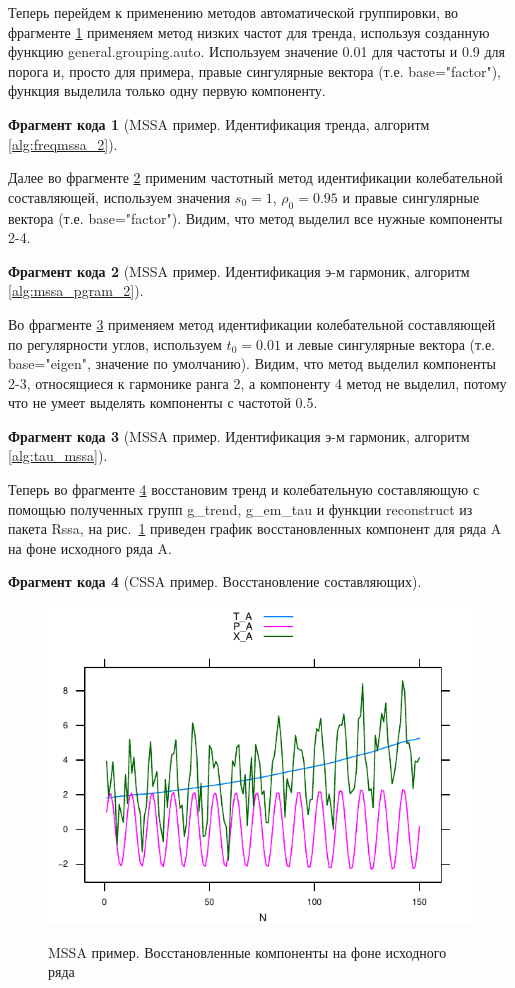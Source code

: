 \documentclass[specialist,
               substylefile = spbu.rtx,
               subf,href,colorlinks=true, 12pt]{disser}
\newtheorem{fragment}{Фрагмент кода}[section]
\newcommand{\bfgh}{\begin{figure}[!htbp]}
\newcommand{\efg}{\end{figure}}
\begin{document}
Теперь перейдем к применению методов автоматической группировки, во фрагменте \ref{frag:mssa_trend} применяем метод низких частот для тренда, используя созданную функцию general.grouping.auto. Используем значение 0.01 для частоты и 0.9 для порога и, просто для примера, правые сингулярные вектора (т.е. base="factor"), функция выделила только одну первую компоненту. 
\begin{fragment}[MSSA пример. Идентификация тренда, алгоритм \ref{alg:freqmssa_2}]
\label{frag:mssa_trend}

\end{fragment}
Далее во фрагменте \ref{frag:mssa_em_freq} применим частотный метод идентификации колебательной составляющей, используем значения $s_0 = 1$, $\rho_0 = 0.95$ и правые сингулярные вектора (т.е. base="factor"). Видим, что метод выделил все нужные компоненты 2-4.
\begin{fragment}[MSSA пример. Идентификация э-м гармоник,  алгоритм \ref{alg:mssa_pgram_2}]
\label{frag:mssa_em_freq}

\end{fragment}
Во фрагменте \ref{frag:mssa_em_tau} применяем метод идентификации колебательной составляющей по регулярности углов, используем $t_0 = 0.01$ и левые сингулярные вектора (т.е. base="eigen", значение по умолчанию).  Видим, что метод выделил компоненты 2-3, относящиеся к гармонике ранга 2, а компоненту 4 метод не выделил, потому что не умеет выделять компоненты с частотой 0.5.
\begin{fragment}[MSSA пример. Идентификация э-м гармоник, алгоритм \ref{alg:tau_mssa}]
\label{frag:mssa_em_tau}

\end{fragment}
Теперь во фрагменте \ref{frag:mssa_rec} восстановим тренд и колебательную составляющую с помощью полученных групп g\_trend, g\_em\_tau и функции reconstruct из пакета Rssa, на рис.~\ref{fig:mssa_rec} приведен график восстановленных компонент для ряда A на фоне исходного ряда A.
\begin{fragment}[CSSA пример. Восстановление составляющих]
\label{frag:mssa_rec}

\end{fragment}
\bfgh
        \begin{center}
{\includegraphics[width=4.5in]{mssa_rec}}
        \end{center}
        \caption{MSSA пример. Восстановленные компоненты на фоне исходного ряда}
        \label{fig:mssa_rec}
\efg
\end{document}
